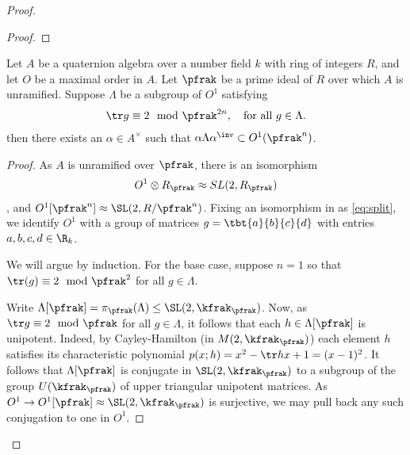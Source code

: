 \begin{proof}
\begin{proof}
  \end{proof}
  \begin{lemma}\label{lemma:MangosteenPicosdeEuropa}
    Let $A$ be a quaternion algebra over a number field $k$ with ring of integers $R$, and let $O$ be a maximal order in $A$.
    Let $\pfrak$ be a prime ideal of $R$ over which $A$ is unramified.
    Suppose $\Lambda$ be a subgroup of $O^1$ satisfying
    \begin{align}\label{eq:trace}
      \tr g \equiv 2 \mod \pfrak^{2n}, \quad \text{for all $g \in \Lambda$}.
    \end{align}
    then there exists an $\alpha \in A^\times$ such that $\alpha \Lambda \alpha^\inv \subset O^1(\pfrak^n)$.
  \end{lemma}
  \begin{proof}


    As $A$ is unramified over $\pfrak$, there is an isomorphism
    \begin{align}\label{eq:split}
      O^1 \otimes R_\pfrak \approx SL(2,R_\pfrak)
    \end{align}, and $O^1[\pfrak^n] \approx \SL(2,R/\pfrak^n)$. Fixing an isomorphism in as \ref{eq:split}, we identify $O^1$ with a group of matrices $g = \tbt{a}{b}{c}{d}$ with entries $a,b,c,d \in \R_k$.

    We will argue by induction. For the base case, suppose $n=1$ so that $\tr(g) \equiv 2 \mod \pfrak^2$ for all $g \in \Lambda$.


    Write $\Lambda[\pfrak] = \pi_{\pfrak}(\Lambda)\leq \SL(2,\kfrak_\pfrak)$. Now, as $\tr g \equiv 2 \mod \pfrak$ for all $g \in \Lambda$, it follows that each $h \in \Lambda[\pfrak]$ is unipotent.
    Indeed, by Cayley-Hamilton (in $M(2,\kfrak_\pfrak)$) each element $h$ satisfies its characteristic polynomial $p(x;h)=x^2 - \tr h x + 1= (x-1)^2$.
    It follows that $\Lambda[\pfrak]$ is conjugate in $\SL(2,\kfrak_\pfrak)$ to a subgroup of the group $U(\kfrak_\pfrak)$ of upper triangular unipotent matrices. As $O^1 \to O^1[\pfrak]\approx \SL(2,\kfrak_\pfrak)$ is surjective, we may pull back any such conjugation to one in $O^1$.


\end{proof}
\end{proof}
